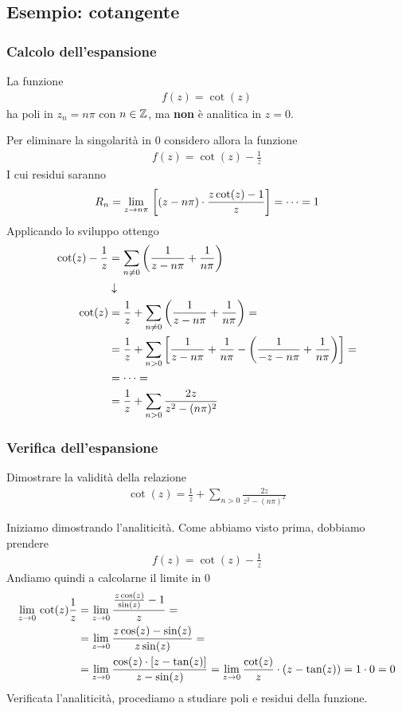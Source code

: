 \subsection{Esempio: cotangente}

\subsubsection{Calcolo dell'espansione}

La funzione  
\begin{align}
	f(z) = \cot(z)
\end{align}
ha poli in $z_n = n\pi$ con $n\in \mathbb{Z}$, ma \textbf{non} è analitica in $z=0$.

Per eliminare la singolarità in 0 considero allora la funzione
\begin{align}
	f(z) = \cot(z) - \frac{1}{z}
\end{align}
I cui residui saranno
\begin{align}
	R_n = \underset{z \rightarrow n\pi}{\lim} \, \left[ (z-n\pi) \cdot \frac{z\cot(z) -1}{z} \right] = \dots = 1  
\end{align}
Applicando lo sviluppo ottengo
\begin{align}
	\cot(z) - \frac{1}{z} &= \sum_{n\neq 0} \left( \frac{1}{z-n\pi} + \frac{1}{n\pi}\right) \\ &\downarrow \nonumber \\
	\cot(z) &= \frac{1}{z} + \sum_{n\neq 0} \left( \frac{1}{z-n\pi} + \frac{1}{n\pi}\right) = \nonumber\\
	&= \frac{1}{z} + \sum_{n>0} \left[ \frac{1}{z-n\pi} + \frac{1}{n\pi} - \left( \frac{1}{-z-n\pi} + \frac{1}{n\pi} \right) \right] = \nonumber\\
	&= \dots  = \nonumber\\
	&= \frac{1}{z} + \sum_{n>0} \frac{2z}{z^2 - (n\pi)^2}
\end{align}

\subsubsection{Verifica dell'espansione}

Dimostrare la validità della relazione
\begin{align}
	\cot(z) = \frac{1}{z} + \sum_{n>0} \frac{2z}{z^2 - (n\pi)^2}
\end{align}

Iniziamo dimostrando l'analiticità. Come abbiamo visto prima, dobbiamo prendere
\begin{align}
	f(z) = \cot(z) - \frac{1}{z}
\end{align}
Andiamo quindi a calcolarne il limite in 0
\begin{align}
	\underset{z \rightarrow 0}{\lim} \, \cot(z) \frac{1}{z} &= \underset{z \rightarrow 0}{\lim} \, \frac{\frac{z\cos(z)}{\sin(z)} -1}{z} = \nonumber\\
	&= \underset{z \rightarrow 0}{\lim} \, \frac{z\cos(z) - \sin(z)}{z\sin (z)} = \nonumber\\
	&= \underset{z \rightarrow 0}{\lim} \,\frac{\cos(z) \cdot [z - \tan (z)]}{z - \sin(z)} = \underset{z \rightarrow 0}{\lim} \, \frac{\cot(z)}{z} \cdot(z-\tan(z)) = 1\cdot 0 = 0
\end{align}
Verificata l'analiticità, procediamo a studiare poli e residui della funzione. 

